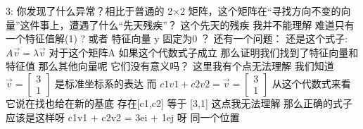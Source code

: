 \documentclass[12pt]{article}
\begin{document}
\begin{flushleft}
    3: 你发现了什么异常？相比于普通的 2×2
    矩阵，这个矩阵在“寻找方向不变的向量”这件事上，遭遇了什么“先天残疾”？
    这个先天的残疾 我并不能理解 难道只有一个特征值解(1) ? 或者 特征向量 y 固定为0 ？
    还有一个问题：
    还是这个式子:  \\
    $A\vec{v} =\lambda \vec{v}$
    对于这个矩阵A 如果这个代数式子成立
    那么证明我们找到了特征向量和特征值 那么其他向量呢
    它们没有意义吗？
    这里我有个点无法理解
    我们知道 $\vec{v} = \begin{bmatrix}
            3 \\
            1
        \end{bmatrix}$ 是标准坐标系的表达
    而 $c1v1 + c2v2 = \vec{v} = \begin{bmatrix}
            3 \\
            1
        \end{bmatrix}$
    从这个代数式来看 它说在找也给在新的基底 存在[c1,c2] 等于 [3,1]
    这点我无法理解
    那么正确的式子应该是这样呀
    c1v1 + c2v2 = 3ei + 1ej 呀 同一个位置
\end{flushleft}
\end{document}
